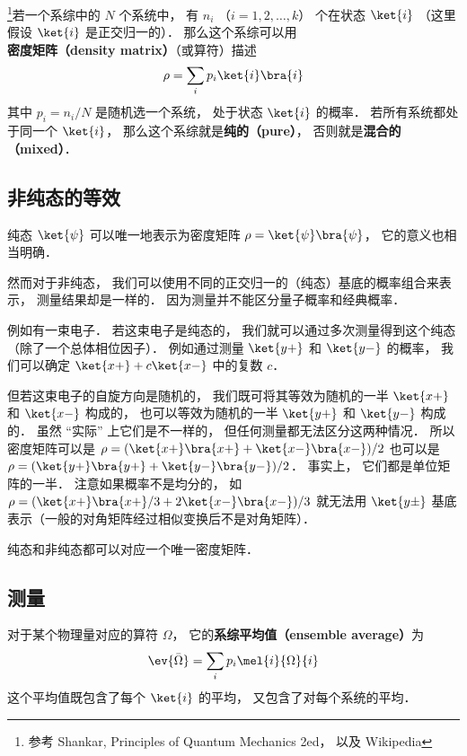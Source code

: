 

\footnote{参考 Shankar, Principles of Quantum Mechanics 2ed， 以及 Wikipedia}若一个系综中的 $N$ 个系统中， 有 $n_i$ （$i = 1,2,\dots,k$） 个在状态 $\ket{i}$ （这里假设 $\ket{i}$ 是正交归一的）． 那么这个系综可以用\textbf{密度矩阵（density matrix）}（或算符）描述
\begin{equation}
\rho = \sum_i p_i\ket{i}\bra{i}   
\end{equation}
其中 $p_i = n_i/N$ 是随机选一个系统， 处于状态 $\ket{i}$ 的概率． 若所有系统都处于同一个 $\ket{i}$， 那么这个系综就是\textbf{纯的（pure）}， 否则就是\textbf{混合的（mixed）}．

\subsection{非纯态的等效}
纯态 $\ket{\psi}$ 可以唯一地表示为密度矩阵 $\rho = \ket{\psi}\bra{\psi}$， 它的意义也相当明确．

然而对于非纯态， 我们可以使用不同的正交归一的（纯态）基底的概率组合来表示， 测量结果却是一样的． 因为测量并不能区分量子概率和经典概率．

例如有一束电子． 若这束电子是纯态的， 我们就可以通过多次测量得到这个纯态（除了一个总体相位因子）． 例如通过测量 $\ket{y+}$ 和 $\ket{y-}$ 的概率， 我们可以确定 $\ket{x+} + c\ket{x-}$ 中的复数 $c$．

但若这束电子的自旋方向是随机的， 我们既可将其等效为随机的一半 $\ket{x+}$ 和 $\ket{x-}$ 构成的， 也可以等效为随机的一半 $\ket{y+}$ 和 $\ket{y-}$ 构成的． 虽然 “实际” 上它们是不一样的， 但任何测量都无法区分这两种情况． 所以密度矩阵可以是 $\rho = (\ket{x+}\bra{x+} + \ket{x-}\bra{x-})/2$ 也可以是 $\rho = (\ket{y+}\bra{y+} + \ket{y-}\bra{y-})/2$． 事实上， 它们都是单位矩阵的一半． 注意如果概率不是均分的， 如 $\rho = (\ket{x+}\bra{x+}/3 + 2\ket{x-}\bra{x-})/3$ 就无法用 $\ket{y\pm}$ 基底表示（一般的对角矩阵经过相似变换后不是对角矩阵）．

纯态和非纯态都可以对应一个唯一密度矩阵．

\subsection{测量}
对于某个物理量对应的算符 $\Omega$， 它的\textbf{系综平均值（ensemble average）}为
\begin{equation}
\ev{\bar\Omega} = \sum_i p_i \mel{i}{\Omega}{i}
\end{equation}
这个平均值既包含了每个 $\ket{i}$ 的平均， 又包含了对每个系统的平均．

